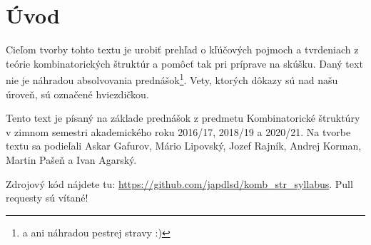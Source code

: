 \chapter*{Úvod}

Cieľom tvorby tohto textu je urobiť prehľad o kľúčových pojmoch a tvrdeniach z teórie kombinatorických štruktúr a pomôcť tak pri príprave na skúšku. 
Daný text nie je náhradou absolvovania prednášok\footnote{a ani náhradou pestrej stravy :)}.
Vety, ktorých dôkazy sú nad našu úroveň, sú označené hviezdičkou.

Tento text je písaný na základe prednášok z predmetu Kombinatorické štruktúry v zimnom semestri akademického roku 2016/17, 2018/19 a 2020/21.
Na tvorbe textu sa podieľali Askar Gafurov, Mário Lipovský, Jozef Rajník, Andrej Korman, Martin Pašeň a Ivan Agarský.


Zdrojový kód nájdete tu: \url{https://github.com/japdlsd/komb_str_syllabus}. Pull requesty sú vítané!

